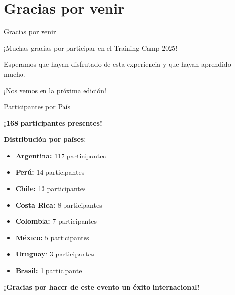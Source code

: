\documentclass{beamer}
\begin{document}
\section{Gracias por venir}

\begin{frame}{Gracias por venir}
\begin{center}
\Large
¡Muchas gracias por participar en el Training Camp 2025!

\vspace{1cm}

Esperamos que hayan disfrutado de esta experiencia y que hayan aprendido mucho.

\vspace{1cm}

¡Nos vemos en la próxima edición!
\end{center}
\end{frame}

\begin{frame}{Participantes por País}
\begin{center}
\Large
\textbf{¡168 participantes presentes!}

\vspace{0.5cm}

\normalsize
\textbf{Distribución por países:}

\vspace{0.3cm}

\begin{itemize}
\item \textbf{Argentina:} 117 participantes
\item \textbf{Perú:} 14 participantes  
\item \textbf{Chile:} 13 participantes
\item \textbf{Costa Rica:} 8 participantes
\item \textbf{Colombia:} 7 participantes
\item \textbf{México:} 5 participantes
\item \textbf{Uruguay:} 3 participantes
\item \textbf{Brasil:} 1 participante
\end{itemize}

\vspace{0.5cm}

\textbf{¡Gracias por hacer de este evento un éxito internacional!}
\end{center}
\end{frame}
\end{document}
